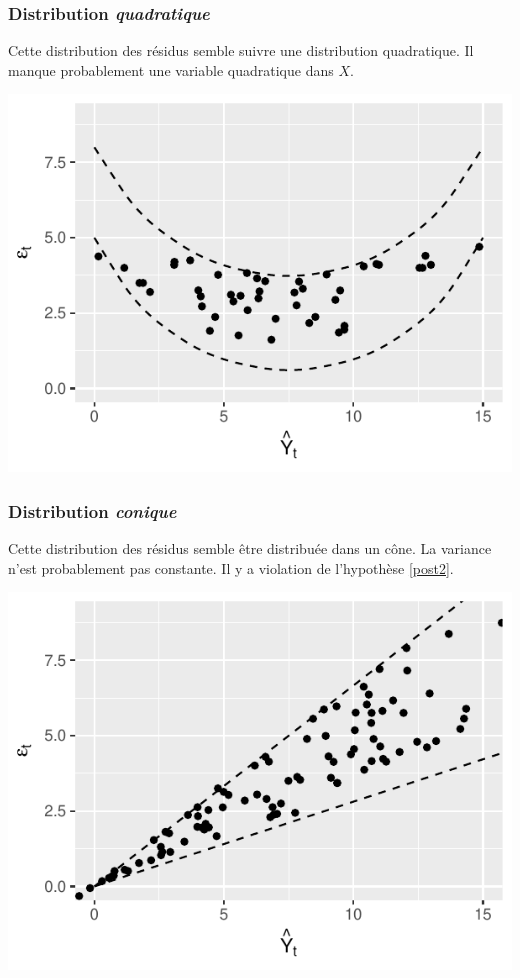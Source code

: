 \documentclass[11pt,french]{report}
\begin{document}
\subsubsection{Distribution \emph{quadratique}}
Cette distribution des résidus semble suivre une distribution quadratique. Il manque probablement une variable quadratique dans $X$.

\bigskip
\includegraphics{notes_de_cours-032}

\subsubsection{Distribution \emph{conique}}
Cette distribution des résidus semble être distribuée dans un cône. La variance n'est probablement pas constante. Il y a violation de l'hypothèse \ref{post2}. 

\bigskip
\includegraphics{notes_de_cours-033}
\end{document}
